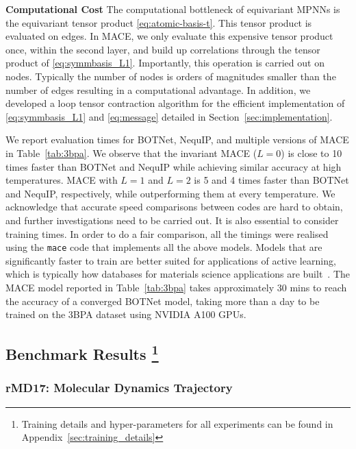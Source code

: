 \documentclass{article}
\newcommand*\compactparagraph[1]{\textbf{#1} \quad}
\begin{document}
\compactparagraph{Computational Cost}
The computational bottleneck of equivariant MPNNs is the equivariant tensor product \eqref{eq:atomic-basis-t}. This tensor product is evaluated on edges. In MACE, we only evaluate this expensive tensor product once, within the second layer, and build up correlations through the tensor product of \eqref{eq:symmbasis_L1}. Importantly, this operation is carried out on nodes. Typically the number of nodes is orders of magnitudes smaller than the number of edges resulting in a computational advantage.
In addition, we developed a loop tensor contraction algorithm for the efficient implementation of \eqref{eq:symmbasis_L1} and \eqref{eq:message} detailed in Section~\ref{sec:implementation}.

We report evaluation times for BOTNet, NequIP, and multiple versions of MACE in Table~\ref{tab:3bpa}.
We observe that the invariant MACE ($L=0$) is close to 10 times faster than BOTNet and NequIP while achieving similar accuracy at high temperatures.
MACE with $L=1$ and $L=2$ is 5 and 4 times faster than BOTNet and NequIP, respectively, while outperforming them at every temperature.
We acknowledge that accurate speed comparisons between codes are hard to obtain, and further investigations need to be carried out.
It is also essential to consider training times. In order to do a fair comparison, all the timings were realised using the \texttt{mace} code that implements all the above models.
Models that are significantly faster to train are better suited for applications of active learning, which is typically how databases for materials science applications are built~\cite{deringer2018boron,deringer2020phosphorus,deringer2021gaussian}.
The MACE model reported in Table~\ref{tab:3bpa} takes approximately 30 mins to reach the accuracy of a converged BOTNet model, taking more than a day to be trained on the 3BPA dataset using NVIDIA A100 GPUs.

\subsection{Benchmark Results \protect\footnote{Training details and hyper-parameters for all experiments can be found in Appendix~\ref{sec:training_details}}}

\subsubsection{rMD17: Molecular Dynamics Trajectory}
\end{document}
